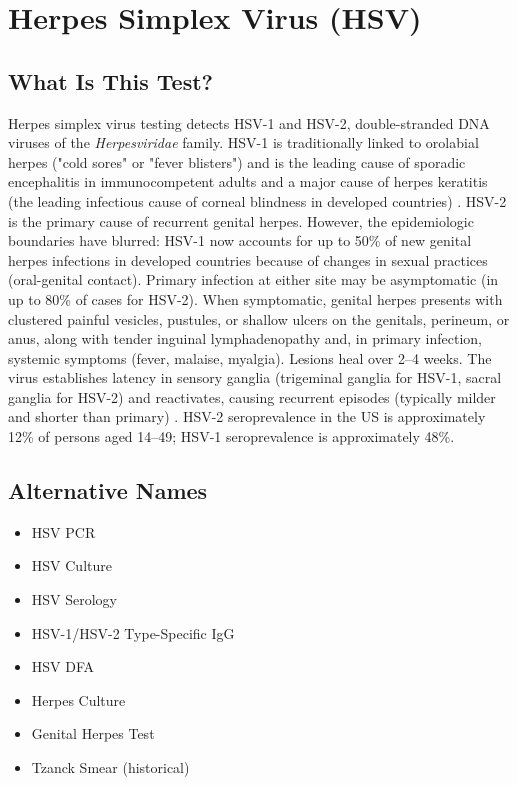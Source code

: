 \chapter{Herpes Simplex Virus (HSV)}

\section*{What Is This Test?}
Herpes simplex virus testing detects HSV-1 and HSV-2, double-stranded DNA viruses of the \textit{Herpesviridae} family. HSV-1 is traditionally linked to orolabial herpes ("cold sores" or "fever blisters") and is the leading cause of sporadic encephalitis in immunocompetent adults and a major cause of herpes keratitis (the leading infectious cause of corneal blindness in developed countries) \cite{whitley2001herpes}. HSV-2 is the primary cause of recurrent genital herpes. However, the epidemiologic boundaries have blurred: HSV-1 now accounts for up to 50\% of new genital herpes infections in developed countries because of changes in sexual practices (oral-genital contact). Primary infection at either site may be asymptomatic (in up to 80\% of cases for HSV-2). When symptomatic, genital herpes presents with clustered painful vesicles, pustules, or shallow ulcers on the genitals, perineum, or anus, along with tender inguinal lymphadenopathy and, in primary infection, systemic symptoms (fever, malaise, myalgia). Lesions heal over 2--4 weeks. The virus establishes latency in sensory ganglia (trigeminal ganglia for HSV-1, sacral ganglia for HSV-2) and reactivates, causing recurrent episodes (typically milder and shorter than primary) \cite{gupta2007genital}. HSV-2 seroprevalence in the US is approximately 12\% of persons aged 14--49; HSV-1 seroprevalence is approximately 48\%.

\section*{Alternative Names}
\begin{itemize}
  \item HSV PCR
  \item HSV Culture
  \item HSV Serology
  \item HSV-1/HSV-2 Type-Specific IgG
  \item HSV DFA
  \item Herpes Culture
  \item Genital Herpes Test
  \item Tzanck Smear (historical)
\end{itemize}
